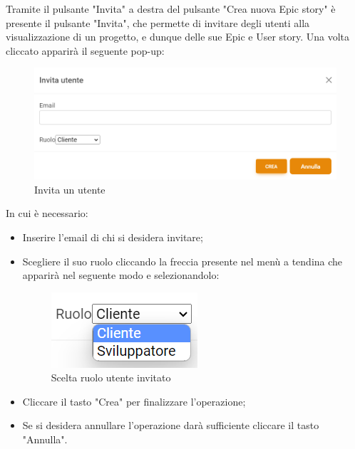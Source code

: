 \documentclass{article}
\begin{document}
Tramite il pulsante "Invita" a destra del pulsante "Crea nuova Epic story" è presente il pulsante "Invita", che permette di invitare degli utenti alla visualizzazione di un progetto, e dunque delle sue Epic e User story. Una volta cliccato apparirà il seguente pop-up:
    \begin{figure}[H]
      \centering
      \includegraphics[width=\textwidth]{documenti/Screenshot manuale utente/invita utente.png}
      \caption{Invita un utente}
      \label{invitautente}
    \end{figure}
In cui è necessario: 
\begin{itemize}
    \item Inserire l'email di chi si desidera invitare;
    \item Scegliere il suo ruolo cliccando la freccia presente nel menù a tendina che apparirà nel seguente modo e selezionandolo:
        \begin{figure}[H]
      \centering
      \includegraphics{documenti/Screenshot manuale utente/ruolo utente invitato.png}
      \caption{Scelta ruolo utente invitato}
      \label{ruolo invito}
    \end{figure}
    \item Cliccare il tasto "Crea" per finalizzare l'operazione;
    \item Se si desidera annullare l'operazione darà sufficiente cliccare il tasto "Annulla".
\end{itemize}
\end{document}
